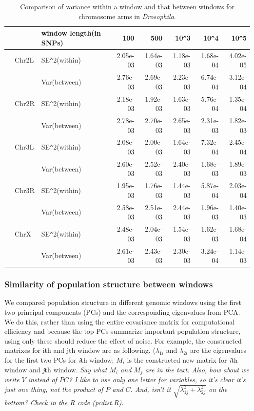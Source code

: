 \documentclass[11pt, oneside]{article}   	%
\newcommand{\plr}[1]{{\em \color{blue} #1}}
\begin{document}
\begin{table}[ht]
\centering
\begin{tabular}{rllrrrrr}
  \hline
 &   & window length(in SNPs) & 100 & 500 & 10\verb|^|3 & 10\verb|^|4 & 10\verb|^|5 \\ 
  \hline
 & Chr2L & SE\verb|^|2(within) & 2.05e-03 & 1.64e-03 & 1.18e-03 & 1.68e-04 & 4.02e-05 \\ 
  & 	 & Var(between) & 2.76e-03 & 2.69e-03 & 2.23e-03 & 6.74e-04 & 3.12e-04 \\ 
  & Chr2R & SE\verb|^|2(within) & 2.18e-03 & 1.92e-03 & 1.63e-03 & 5.76e-04 & 1.35e-04 \\ 
  & 	 & Var(between) & 2.78e-03 & 2.70e-03 & 2.65e-03 & 2.31e-03 & 1.82e-03 \\ 
  & Chr3L & SE\verb|^|2(within) & 2.08e-03 & 2.00e-03 & 1.64e-03 & 7.32e-04 & 2.45e-04 \\ 
  & 	 & Var(between) & 2.60e-03 & 2.52e-03 & 2.40e-03 & 1.68e-03 & 1.89e-03 \\ 
  & Chr3R & SE\verb|^|2(within) & 1.95e-03 & 1.76e-03 & 1.44e-03 & 5.87e-04 & 2.03e-04 \\ 
  & 	 & Var(between) & 2.58e-03 & 2.51e-03 & 2.44e-03 & 1.96e-03 & 1.40e-03 \\ 
  & ChrX & SE\verb|^|2(within) & 2.48e-03 & 2.04e-03 & 1.54e-03 & 1.62e-03 & 1.68e-04 \\ 
  & 	 & Var(between) & 2.61e-03 & 2.43e-03 & 2.30e-03 & 3.24e-04 & 1.14e-03 \\ 
   \hline
\end{tabular}
\caption{
Comparison of variance within a window and that between windows for chromosome arms in \textit{Drosophila}.
} \label{tab:window_sizes}
\end{table}

\subsubsection{Similarity of population structure between windows}
We compared population structure in different genomic windows 
using the first two principal components (PCs) and the corresponding eigenvalues from PCA.
We do this, rather than using the entire covariance matrix for computational efficiency 
and because the top PCs summarize important population structure, 
using only these should reduce the effect of noise.
For example, the constructed matrixes for ith and jth window are as following. 
($\lambda _{1i}$ and $\lambda _{2i}$ are the eigenvalues for the first two PCs for \textit{i}th window; 
$M_i$ is the constructed new matrix for \textit{i}th window and \textit{j}th window.
\plr{
Say what $M_i$ and $M_j$ are in the text.  
Also, how about we write $V$ instead of $PC$?  I like to use only one letter for variables, so it's clear it's just one thing, not the product of $P$ and $C$.
And, isn't it $\sqrt{\lambda_{1j}^2+\lambda_{2j}^2}$ on the bottom? Check in the R code (pc{\textunderscore}dist.R).
}
\end{document}
